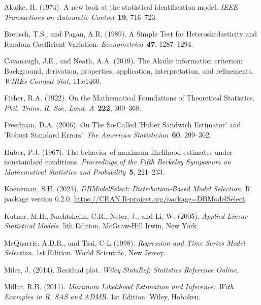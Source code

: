 \documentclass[12pt]{article} %
\theoremstyle{definition}
\begin{document}
\begin{thebibliography}{}

Akaike, H. (1974).
 A new look at the statistical identification model.
{\em IEEE Transactions on Automatic Control}~{\bf 19}, 716--723.

Breusch, T.S., and Pagan, A.R. (1989).
 A Simple Test for Heteroskedasticity and Random Coefficient Variation.
{\em Econometrica}~{\bf 47}, 1287--1294.

Cavanaugh, J.E., and Neath, A.A. (2019).
 The Akaike information criterion: Background, derivation, properties, application, interpretation, and refinements.
{\em WIREs Comput Stat}, 11:e1460.

Fisher, R.A. (1922).
 On the Mathematical Foundations of Theoretical Statistics.
{\em Phil. Trans. R. Soc. Lond. A}~{\bf 222}, 309--368.

Freedman, D.A. (2006).
 On The So-Called 'Huber Sandwich Estimator' and 'Robust Standard Errors'.
{\em The American Statistician}~{\bf 60}, 299--302.

Huber, P.J. (1967).
 The behavior of maximum likelihood estimates under nonstandard conditions.
{\em Proceedings of the Fifth Berkeley Symposium on Mathematical Statistics and Probability}~{\bf 5}, 221--233.

Koeneman, S.H. (2023).
 {\em DBModelSelect: Distribution-Based Model Selection}.
R package version 0.2.0, \url{https://CRAN.R-project.org/package=DBModelSelect}.

Kutner, M.H., Nachtsheim, C.R., Neter, J., and Li, W. (2005).
 {\em Applied Linear Statistical Models}.
5th Edition. McGraw-Hill Irwin, New York.

McQuarrie, A.D.R., and Tsai, C-L (1998).
 {\em Regression and Time Series Model Selection.}
1st Edition. World Scientific, New Jersey.

Miles, J. (2014).
 Residual plot.
{\em Wiley StatsRef: Statistics Reference Online}.

Millar, R.B. (2011).
 {\em Maximum Likelihood Estimation and Inference: With Examples in R, SAS and ADMB.}
1st Edition. Wiley, Hoboken.


\end{thebibliography}
\end{document}
